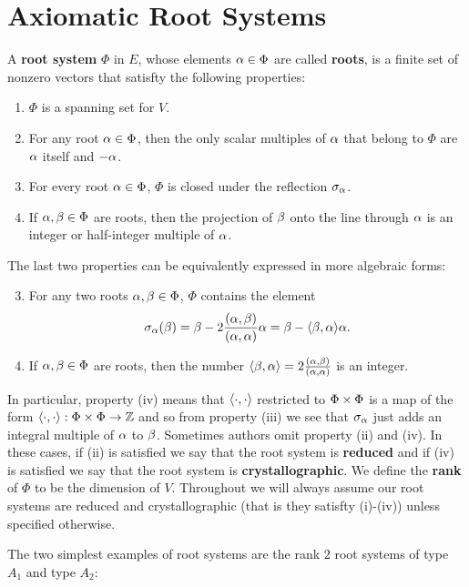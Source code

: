\documentclass[12pt,reqno,oneside]{amsart}
\begin{document}
\section*{Axiomatic Root Systems}
     A \textbf{root system} $\Phi$ in $E$, whose elements $\alpha \in \Phi$ are called \textbf{roots}, is a finite set of nonzero vectors that satisfty the following properties:

    \begin{enumerate}[label=(\roman*)]
        \item $\Phi$ is a spanning set for $V$.
        \item For any root $\alpha \in \Phi$, then the only scalar multiples of $\alpha$ that belong to $\Phi$ are $\alpha$ itself and $-\alpha$.
        \item For every root $\alpha \in \Phi$, $\Phi$ is closed under the reflection $\sigma_{\alpha}$.
        \item If $\alpha,\beta \in \Phi$ are roots, then the projection of $\beta$ onto the line through $\alpha$ is an integer or half-integer multiple of $\alpha$.
    \end{enumerate}

    The last two properties can be equivalently expressed in more algebraic forms:

    \begin{enumerate}[label=(\roman*)]
        \setcounter{enumi}{2}
        \item For any two roots $\alpha,\beta \in \Phi$, $\Phi$ contains the element
        \[
            \sigma_{\alpha}(\beta) = \beta-2\frac{(\alpha,\beta)}{(\alpha,\alpha)}\alpha = \beta-\langle\beta,\alpha\rangle\alpha.
        \]
        \item If $\alpha,\beta \in \Phi$ are roots, then the number $\langle\beta,\alpha\rangle = 2\frac{(\alpha,\beta)}{(\alpha,\alpha)}$ is an integer.
    \end{enumerate}
    
    In particular, property (iv) means that $\langle\cdot,\cdot\rangle$ restricted to $\Phi \times \Phi$ is a map of the form $\langle\cdot,\cdot\rangle:\Phi \times \Phi \to \mathbb{Z}$ and so from property (iii) we see that $\sigma_{\alpha}$ just adds an integral multiple of $\alpha$ to $\beta$. Sometimes authors omit property (ii) and (iv). In these cases, if (ii) is satisfied we say that the root system is \textbf{reduced} and if (iv) is satisfied we say that the root system is \textbf{crystallographic}. We define the \textbf{rank} of $\Phi$ to be the dimension of $V$. Throughout we will always assume our root systems are reduced and crystallographic (that is they satisfty (i)-(iv)) unless specified otherwise.

    The two simplest examples of root systems are the rank $2$ root systems of type $A_{1}$ and type $A_{2}$:
\end{document}
